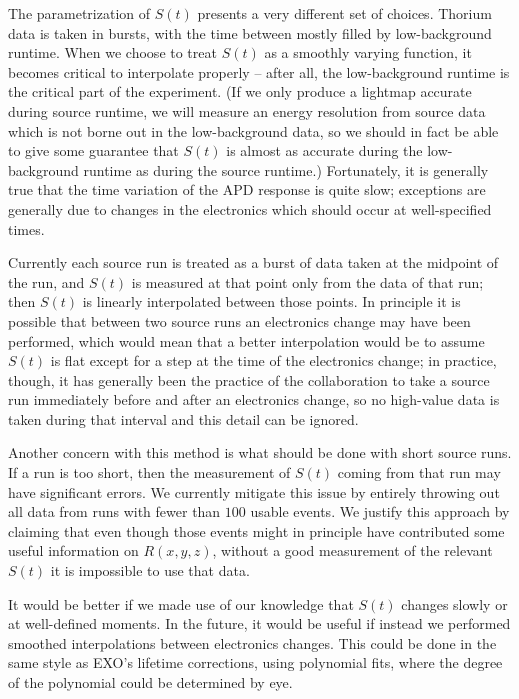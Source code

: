 The parametrization of $S(t)$ presents a very different set of choices.  Thorium data is taken in bursts, with the time between mostly filled by low-background runtime.  When we choose to treat $S(t)$ as a smoothly varying function, it becomes critical to interpolate properly -- after all, the low-background runtime is the critical part of the experiment.  (If we only produce a lightmap accurate during source runtime, we will measure an energy resolution from source data which is not borne out in the low-background data, so we should in fact be able to give some guarantee that $S(t)$ is almost as accurate during the low-background runtime as during the source runtime.)  Fortunately, it is generally true that the time variation of the APD response is quite slow; exceptions are generally due to changes in the electronics which should occur at well-specified times.

Currently each source run is treated as a burst of data taken at the midpoint of the run, and $S(t)$ is measured at that point only from the data of that run; then $S(t)$ is linearly interpolated between those points.  In principle it is possible that between two source runs an electronics change may have been performed, which would mean that a better interpolation would be to assume $S(t)$ is flat except for a step at the time of the electronics change; in practice, though, it has generally been the practice of the collaboration to take a source run immediately before and after an electronics change, so no high-value data is taken during that interval and this detail can be ignored.

Another concern with this method is what should be done with short source runs.  If a run is too short, then the measurement of $S(t)$ coming from that run may have significant errors.  We currently mitigate this issue by entirely throwing out all data from runs with fewer than $100$ usable events.  We justify this approach by claiming that even though those events might in principle have contributed some useful information on $R(x,y,z)$, without a good measurement of the relevant $S(t)$ it is impossible to use that data.

It would be better if we made use of our knowledge that $S(t)$ changes slowly or at well-defined moments.  In the future, it would be useful if instead we performed smoothed interpolations between electronics changes.  This could be done in the same style as EXO's lifetime corrections, using polynomial fits, where the degree of the polynomial could be determined by eye.

